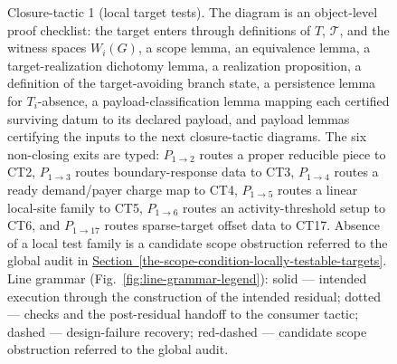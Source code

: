 \documentclass[
  11pt,
]{article}
\theoremstyle{definition}
\newcommand{\secref}[1]{\hyperref[#1]{Section~\ref*{#1}}}
\begin{document}
\begin{figure}[p]
{%
}
\caption[Closure-tactic 1: local target tests]{Closure-tactic 1 (local target tests).  The diagram is an object-level proof checklist: the target enters through definitions of \(T\), \(\mathcal T\), and the witness spaces \(W_i(G)\), a scope lemma, an equivalence lemma, a target-realization dichotomy lemma, a realization proposition, a definition of the target-avoiding branch state, a persistence lemma for \(T_i\)-absence, a payload-classification lemma mapping each certified surviving datum to its declared payload, and payload lemmas certifying the inputs to the next closure-tactic diagrams.  The six non-closing exits are typed: \(P_{1\to2}\) routes a proper reducible piece to CT2, \(P_{1\to3}\) routes boundary-response data to CT3, \(P_{1\to4}\) routes a ready demand/payer charge map to CT4, \(P_{1\to5}\) routes a linear local-site family to CT5, \(P_{1\to6}\) routes an activity-threshold setup to CT6, and \(P_{1\to17}\) routes sparse-target offset data to CT17.  Absence of a local test family is a candidate scope obstruction referred to the global audit in \secref{the-scope-condition-locally-testable-targets}.  Line grammar (Fig.~\ref{fig:line-grammar-legend}): solid --- intended execution through the construction of the intended residual; dotted --- checks and the post-residual handoff to the consumer tactic; dashed --- design-failure recovery; red-dashed --- candidate scope obstruction referred to the global audit.}
\label{fig:ct1-local-target-tests}
\end{figure}
\FloatBarrier
\end{document}
